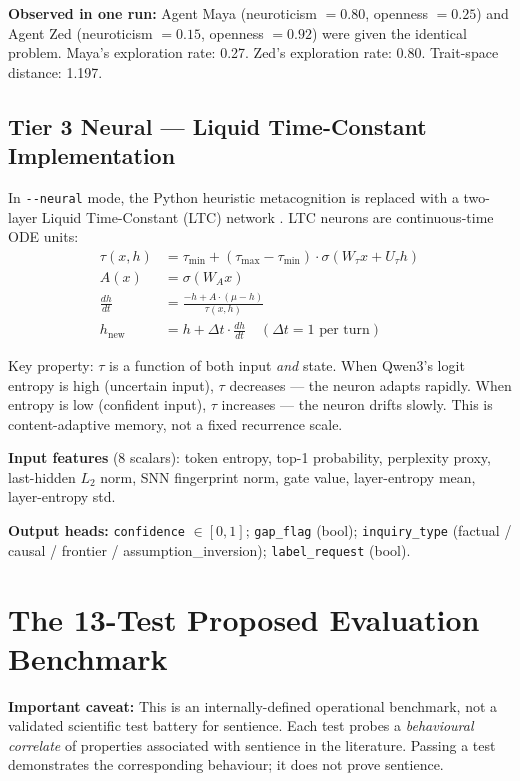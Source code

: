 \documentclass[11pt,a4paper]{article}
\begin{document}
\textbf{Observed in one run:} Agent Maya (neuroticism $= 0.80$, openness $= 0.25$) and
Agent Zed (neuroticism $= 0.15$, openness $= 0.92$) were given the identical problem.
Maya's exploration rate: 0.27. Zed's exploration rate: 0.80. Trait-space distance: 1.197.

\subsection{Tier 3 Neural — Liquid Time-Constant Implementation}

In \texttt{-{}-neural} mode, the Python heuristic metacognition is replaced with a
two-layer Liquid Time-Constant (LTC) network \cite{hasani2021}. LTC neurons are
continuous-time ODE units:
\begin{align}
  \tau(x, h) &= \tau_{\min} + (\tau_{\max} - \tau_{\min}) \cdot \sigma(W_\tau x + U_\tau h)\\
  A(x)       &= \sigma(W_A x)\\
  \frac{dh}{dt} &= \frac{-h + A \cdot (\mu - h)}{\tau(x,h)}\\
  h_{\text{new}} &= h + \Delta t \cdot \frac{dh}{dt} \quad (\Delta t = 1 \text{ per turn})
\end{align}

Key property: $\tau$ is a function of both input \textit{and} state. When Qwen3's logit
entropy is high (uncertain input), $\tau$ decreases — the neuron adapts rapidly. When
entropy is low (confident input), $\tau$ increases — the neuron drifts slowly. This is
content-adaptive memory, not a fixed recurrence scale.

\textbf{Input features} (8 scalars): token entropy, top-1 probability, perplexity proxy,
last-hidden $L_2$ norm, SNN fingerprint norm, gate value, layer-entropy mean,
layer-entropy std.

\textbf{Output heads:} \texttt{confidence} $\in [0,1]$; \texttt{gap\_flag} (bool);
\texttt{inquiry\_type} (factual / causal / frontier / assumption\_inversion);
\texttt{label\_request} (bool).

\section{The 13-Test Proposed Evaluation Benchmark}

\textbf{Important caveat:} This is an internally-defined operational benchmark, not a
validated scientific test battery for sentience. Each test probes a \textit{behavioural
correlate} of properties associated with sentience in the literature. Passing a test
demonstrates the corresponding behaviour; it does not prove sentience.
\end{document}

